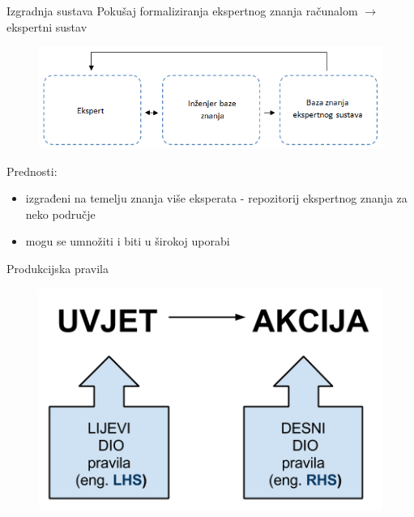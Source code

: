 \documentclass[xcolor=dvipsnames]{beamer}
\begin{document}
\begin{frame}{Izgradnja sustava}
Pokušaj formaliziranja ekspertnog znanja računalom $\rightarrow$ ekspertni sustav
\begin{figure}
\center

\includegraphics[scale=0.5]{img/konstr.png}

\end{figure}

Prednosti:
\begin{itemize}
\item izgrađeni na temelju znanja više eksperata - repozitorij ekspertnog znanja za neko područje
\item mogu se umnožiti i biti u širokoj uporabi
\end{itemize}

\end{frame}


\begin{frame}{Produkcijska pravila}

\begin{figure}
\center

\includegraphics[scale=0.5]{img/HS.png}

\end{figure}

\end{frame}
\end{document}
